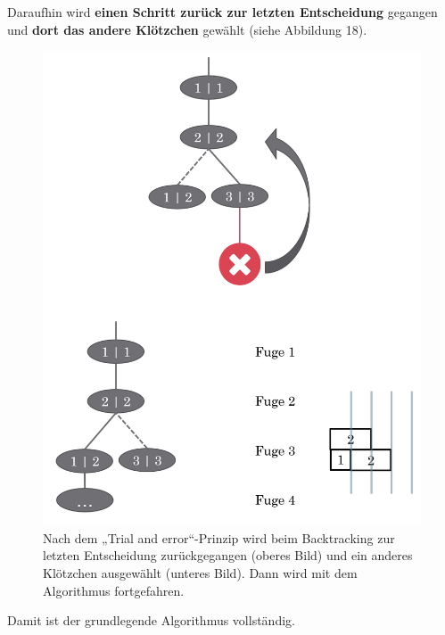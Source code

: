 \documentclass[a4paper,12pt]{article}
\begin{document}
Daraufhin wird \textbf{einen Schritt zurück zur letzten Entscheidung} gegangen und \textbf{dort das andere Klötzchen} gewählt (siehe Abbildung 18).
\begin{figure}[H]
    \centering
    \includegraphics[width=1\linewidth]{Bilder/Aufgabe1/Backtracking_03_04.png}
    \caption{Nach dem „Trial and error“-Prinzip wird beim Backtracking zur letzten Entscheidung zurückgegangen (oberes Bild) und ein anderes Klötzchen ausgewählt (unteres Bild). Dann wird mit dem Algorithmus fortgefahren.}
\end{figure}

Damit ist der grundlegende Algorithmus vollständig.
\end{document}
